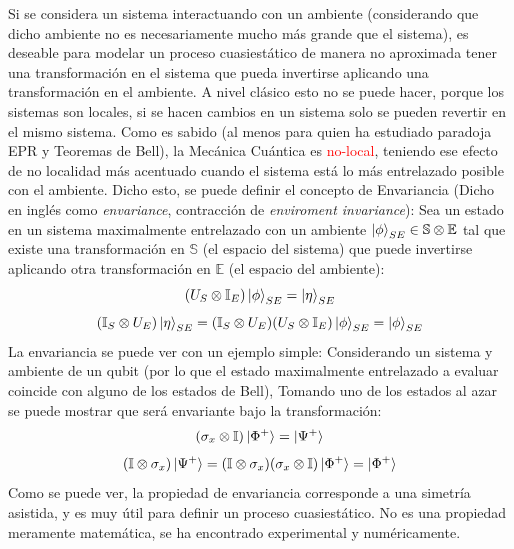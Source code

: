 \documentclass{book}
\begin{document}
    Si se considera un sistema interactuando con un ambiente (considerando que dicho ambiente no es necesariamente mucho más grande que el sistema), es deseable para modelar un proceso cuasiestático de manera no aproximada tener una transformación en el sistema que pueda invertirse aplicando una transformación en el ambiente. 
    A nivel clásico esto no se puede hacer, porque los sistemas son locales, si se hacen cambios en un sistema solo se pueden revertir en el mismo sistema. 
    Como es sabido (al menos para quien ha estudiado paradoja EPR y Teoremas de Bell), la Mecánica Cuántica es \textcolor{red}{no-local}, teniendo ese efecto de no localidad más acentuado cuando el sistema está lo más entrelazado posible con el ambiente. 
    Dicho esto, se puede definir el concepto de Envariancia (Dicho en inglés como \textit{envariance}, contracción de \textit{enviroment invariance}): Sea un estado en un sistema maximalmente entrelazado con un ambiente $\ket{\phi}_{SE} \in \mathbb{S}\otimes\mathbb{E}$ tal que existe una transformación en $\mathbb{S}$ (el espacio del sistema) que puede invertirse aplicando otra transformación en $\mathbb{E}$ (el espacio del ambiente):
    \begin{equation}\label{eq3.7}(U_{S}\otimes\mathbb{I}_E)\ket{\phi}_{SE}=\ket{\eta}_{SE}\end{equation}
    \begin{equation}\label{eq3.8}(\mathbb{I}_S\otimes U_{E})\ket{\eta}_{SE}=(\mathbb{I}_S\otimes U_{E})(U_{S}\otimes\mathbb{I}_E)\ket{\phi}_{SE}=\ket{\phi}_{SE}\end{equation}
    La envariancia se puede ver con un ejemplo simple: Considerando un sistema y ambiente de un qubit (por lo que el estado maximalmente entrelazado a evaluar coincide con alguno de los estados de Bell), Tomando uno de los estados al azar se puede mostrar que será envariante bajo la transformación:
    \begin{equation}\label{eq3.9}(\sigma_x\otimes\mathbb{I})\ket{\Phi^+}=\ket{\Psi^+}\end{equation}
    \begin{equation}\label{eq3.10}(\mathbb{I}\otimes\sigma_x)\ket{\Psi^+}=(\mathbb{I}\otimes\sigma_x)(\sigma_x\otimes\mathbb{I})\ket{\Phi^+}=\ket{\Phi^+}\end{equation}
    Como se puede ver, la propiedad de envariancia corresponde a una simetría asistida, y es muy útil para definir un proceso cuasiestático. No es una propiedad meramente matemática, se ha encontrado experimental y numéricamente.
\end{document}
